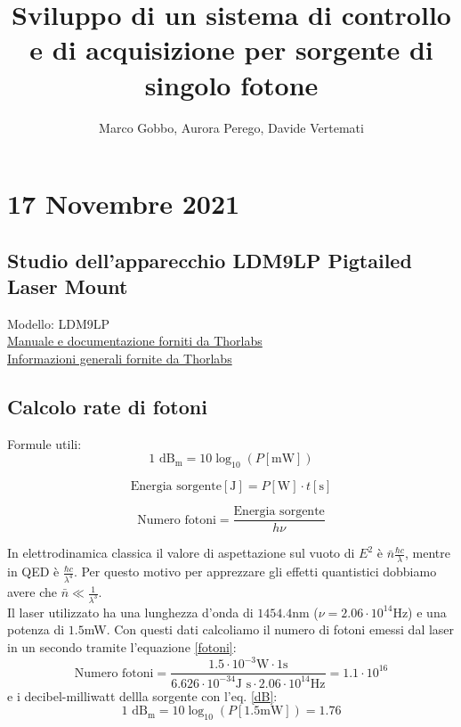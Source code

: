 \documentclass{article}
\title{Sviluppo di un sistema di controllo e di acquisizione per sorgente di singolo fotone}
\author{Marco Gobbo, Aurora Perego, Davide Vertemati}
\numberwithin{equation}{section}
\begin{document}
\maketitle

\section{17 Novembre 2021}
\subsection{Studio dell’apparecchio LDM9LP 
Pigtailed Laser Mount}
Modello: LDM9LP\\
\href{https://www.thorlabs.com/_sd.cfm?fileName=TTN027954-D02.pdf&partNumber=LDM9LP}{Manuale e documentazione forniti da Thorlabs}\\
\href{https://www.thorlabs.com/newgrouppage9.cfm?objectgroup_id=4839&pn=LDM9LP#4839}{Informazioni generali fornite da Thorlabs}

\subsection{Calcolo rate di fotoni}
Formule utili:
\begin{equation} \label{dB}
    1 \text{ dB}_\text{m}=10 \log_{10}\left(P\left[\text{mW}\right]\right)
\end{equation}

\begin{equation} \label{energia}
    \text{Energia sorgente} [\text{J}] = P[\text{W}]\cdot t[\text{s}]
\end{equation}

\begin{equation} \label{fotoni}
    \text{Numero fotoni}=\frac{\text{Energia sorgente}}{h\nu}
\end{equation}

\noindent In elettrodinamica classica il valore di aspettazione sul vuoto di $E^2$ è $\bar{n} \frac{\hbar c}{\lambda}$, mentre in QED è $\frac{\hbar c}{\lambda^4}$.
Per questo motivo per apprezzare gli effetti quantistici dobbiamo avere che $\bar{n}\ll\frac{1}{\lambda^3}$. \\
\noindent Il laser utilizzato ha una lunghezza d'onda di $1454.4$nm ($\nu = 2.06 \cdot 10^{14}$Hz) e una potenza di $1.5$mW. Con questi dati calcoliamo il numero di fotoni emessi dal laser in un secondo tramite l'equazione \eqref{fotoni}:
\begin{equation*} 
    \text{Numero fotoni}=\frac{1.5\cdot10^{-3}\text{W}\cdot1\text{s}}{6.626 \cdot 10^{-34} \text{J s} \cdot 2.06 \cdot 10^{14}\text{Hz}} = 1.1\cdot 10^{16}
\end{equation*}
e i decibel-milliwatt dellla sorgente con l'eq. \ref{dB}:
\begin{equation*}
    1 \text{ dB}_\text{m}=10\log_{10}\left(P\left[1.5 \text{mW}\right]\right)=1.76
\end{equation*}
\end{document}
